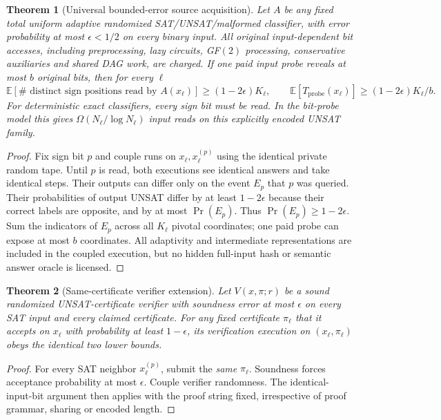 \documentclass[11pt]{article}
\newtheorem{theorem}{Theorem}
\begin{document}
\begin{theorem}[Universal bounded-error source acquisition]
Let $A$ be any fixed total uniform adaptive randomized SAT/UNSAT/malformed classifier, with error probability at most $\epsilon<1/2$ on every binary input. All original input-dependent bit accesses, including preprocessing, lazy circuits, GF$(2)$ processing, conservative auxiliaries and shared DAG work, are charged. If one paid input probe reveals at most $b$ original bits, then for every $\ell$
\[
\mathbb E[\#\text{ distinct sign positions read by }A(x_\ell)]
\ge (1-2\epsilon)K_\ell,\qquad
\mathbb E[T_{\mathrm{probe}}(x_\ell)]\ge(1-2\epsilon)K_\ell/b.
\]
For deterministic exact classifiers, every sign bit must be read. In the bit-probe model this gives $\Omega(N_\ell/\log N_\ell)$ input reads on this explicitly encoded UNSAT family.
\end{theorem}
\begin{proof}
Fix sign bit $p$ and couple runs on $x_\ell,x_\ell^{(p)}$ using the identical private random tape. Until $p$ is read, both executions see identical answers and take identical steps. Their outputs can differ only on the event $E_p$ that $p$ was queried. Their probabilities of output UNSAT differ by at least $1-2\epsilon$ because their correct labels are opposite, and by at most $\Pr(E_p)$. Thus $\Pr(E_p)\ge1-2\epsilon$. Sum the indicators of $E_p$ across all $K_\ell$ pivotal coordinates; one paid probe can expose at most $b$ coordinates. All adaptivity and intermediate representations are included in the coupled execution, but no hidden full-input hash or semantic answer oracle is licensed.
\end{proof}
\begin{theorem}[Same-certificate verifier extension]
Let $V(x,\pi;r)$ be a sound randomized UNSAT-certificate verifier with soundness error at most $\epsilon$ on \emph{every SAT input and every claimed certificate}. For any fixed certificate $\pi_\ell$ that it accepts on $x_\ell$ with probability at least $1-\epsilon$, its verification execution on $(x_\ell,\pi_\ell)$ obeys the identical two lower bounds.
\end{theorem}
\begin{proof}
For every SAT neighbor $x_\ell^{(p)}$, submit the \emph{same} $\pi_\ell$. Soundness forces acceptance probability at most $\epsilon$. Couple verifier randomness. The identical-input-bit argument then applies with the proof string fixed, irrespective of proof grammar, sharing or encoded length.
\end{proof}
\end{document}

